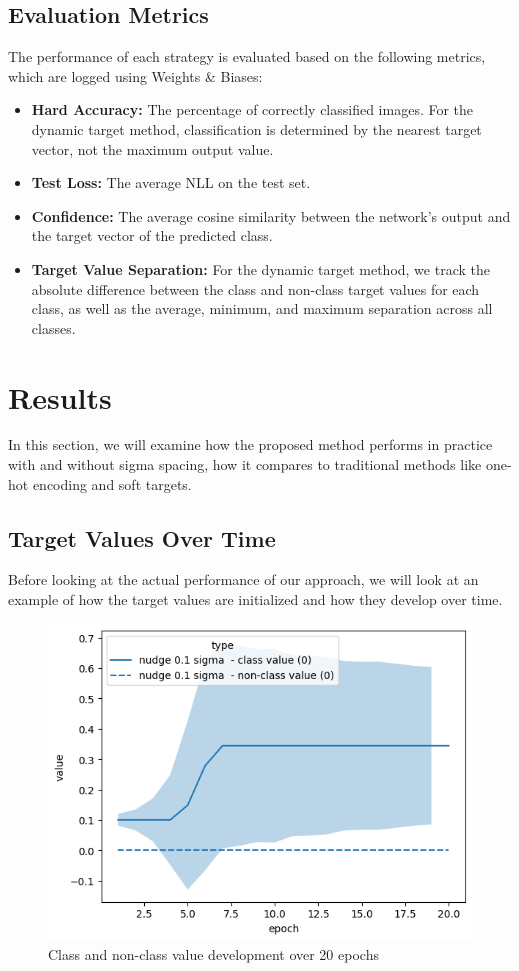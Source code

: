 \documentclass[12pt,fleqn,a4paper]{article}
\begin{document}
 \subsection{Evaluation Metrics}
 The performance of each strategy is evaluated based on the following metrics, which are logged using Weights \& Biases:
 \begin{itemize}
     \item \textbf{Hard Accuracy:} The percentage of correctly classified images. For the dynamic target method, classification is determined by the nearest target vector, not the maximum output value.
     \item \textbf{Test Loss:} The average NLL on the test set.
     \item \textbf{Confidence:} The average cosine similarity between the network's output and the target vector of the predicted class.
     \item \textbf{Target Value Separation:} For the dynamic target method, we track the absolute difference between the class and non-class target values for each class, as well as the average, minimum, and maximum separation across all classes.
 \end{itemize}

\section{Results}
In this section, we will examine how the proposed method performs in practice with and without sigma spacing, how it compares to traditional methods like one-hot encoding and soft targets.

\subsection{Target Values Over Time}
Before looking at the actual performance of our approach, we will look at an example of how the target values are initialized and how they develop over time.
\begin{figure}[H]
    \centering
    \includegraphics[width=0.5\linewidth]{graphs/sigma.png}
    \caption{Class and non-class value development over 20 epochs}
    \label{fig:class_dev}
\end{figure}
\end{document}
